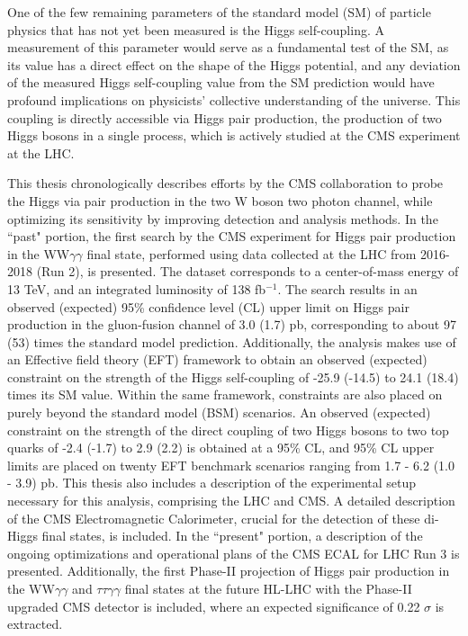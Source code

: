 One of the few remaining parameters of the standard model (SM) of particle physics that has not yet been measured is the Higgs self-coupling. A measurement of this parameter would serve as a fundamental test of the SM, as its value has a direct effect on the shape of the Higgs potential, and any deviation of the measured Higgs self-coupling value from the SM prediction would have profound implications on physicists' collective understanding of the universe. This coupling is directly accessible via Higgs pair production, the production of two Higgs bosons in a single process, which is actively studied at the CMS experiment at the LHC. 

This thesis chronologically describes efforts by the CMS collaboration to probe the Higgs via pair production in the two W boson two photon channel, while optimizing its sensitivity by improving detection and analysis methods. In the ``past" portion, the first search by the CMS experiment for Higgs pair production in the WW$\gamma\gamma$ final state, performed using data collected at the LHC from 2016-2018 (Run 2), is presented. The dataset corresponds to a center-of-mass energy of 13 TeV, and an integrated luminosity of 138 fb$^{-1}$. The search results in an observed (expected) 95\% confidence level (CL) upper limit on Higgs pair production in the gluon-fusion channel of 3.0 (1.7) pb, corresponding to about 97 (53) times the standard model prediction. Additionally, the analysis makes use of an Effective field theory (EFT) framework to obtain an observed (expected) constraint on the strength of the Higgs self-coupling of -25.9 (-14.5) to 24.1 (18.4) times its SM value. Within the same framework, constraints are also placed on purely beyond the standard model (BSM) scenarios. An observed (expected) constraint on the strength of the direct coupling of two Higgs bosons to two top quarks of -2.4 (-1.7) to 2.9 (2.2) is obtained at a 95\% CL, and 95\% CL upper limits are placed on twenty EFT benchmark scenarios ranging from 1.7 - 6.2 (1.0 - 3.9) pb. This thesis also includes a description of the experimental setup necessary for this analysis, comprising the LHC and CMS. A detailed description of the CMS Electromagnetic Calorimeter, crucial for the detection of these di-Higgs final states, is included. In the ``present" portion, a description of the ongoing optimizations and operational plans of the CMS ECAL for LHC Run 3 is presented. Additionally, the first Phase-II projection of Higgs pair production in the WW$\gamma\gamma$ and $\tau\tau\gamma\gamma$ final states at the future HL-LHC with the Phase-II upgraded CMS detector is included, where an expected significance of 0.22 $\sigma$ is extracted.